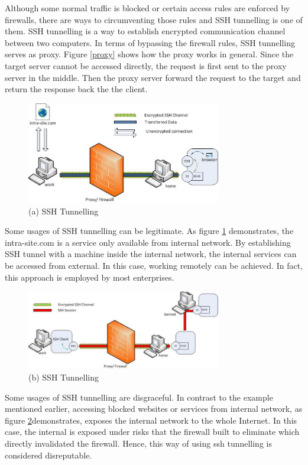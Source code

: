 \documentclass{article}
\begin{document}
Although some normal traffic is blocked or certain access rules are enforced by firewalls, there are ways 
to circumventing those rules and SSH tunnelling is one of them. 
SSH tunnelling is a way to establish encrypted communication channel between two computers. In terms of 
bypassing the firewall rules, SSH tunnelling serves as proxy. Figure \ref{proxy} shows how the proxy works 
in general. Since the target server cannot be accessed directly, the request is first sent to the proxy 
server in the middle. Then the proxy server forward the request to the target and return the response 
back the the client.

\begin{figure}[H]
  \includegraphics[width=8.5cm]{ssh1}
  \caption{(a) SSH Tunnelling\cite{chamith_2012}}
  \label{ssh1}
\end{figure}

Some usages of SSH tunnelling can be legitimate. As figure \ref{ssh1} demonstrates, the intra-site.com is 
a service only available from internal network. By establishing SSH tunnel with a machine inside the internal 
network, the internal services can be accessed from external. In this case, working remotely can be achieved. 
In fact, this approach is employed by most enterprises.

\begin{figure}[H]
  \includegraphics[width=8.5cm]{ssh2}
  \caption{(b) SSH Tunnelling \cite{chamith_2012}}
  \label{ssh2}
\end{figure}
Some usages of SSH tunnelling are disgraceful. In contrast to the example mentioned earlier, 
accessing blocked websites or services from internal network, as figure \ref{ssh2}demonstrates, 
exposes the internal network to the whole Internet. 
In this case, the internal is exposed under risks that the firewall built to eliminate which directly 
invalidated the firewall. Hence, this way of using ssh tunnelling is considered disreputable. 
\end{document}
